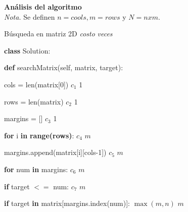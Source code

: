 \documentclass{article}
\begin{document}
\textbf{Análisis del algoritmo} \\
\textit{Nota.} Se definen $n=cools, m = rows$ y $N = nxm$.
\begin{algorithm}
\caption{Búsqueda en matriz 2D \hspace{3.5cm} \textit{costo} \hspace{0.5cm} \textit{veces}}\label{Primer algoritmo}
\begin{algorithmic}
\item \textbf{class} Solution:
    \item \hspace{0.3cm} \textbf{def} searchMatrix(self, matrix, target):
        \item \hspace{0.7cm} cols = len(matrix[0]) \hspace{5.2cm} $c_1$ \hspace{1.1cm} 1 
        \item \hspace{0.7cm} rows = len(matrix) \hspace{5.45cm} $c_2$ \hspace{1.1cm} 1
        \item \hspace{0.7cm} margins = [] \hspace{6.5cm} $c_3$ \hspace{1.1cm} 1
        \item \hspace{0.7cm} \textbf{for} i \textbf{in} \textbf{range(rows)}: \hspace{4.95cm} $c_4$ \hspace{1.1cm} $m$
            \item \hspace{1.2cm} margins.append(matrix[i][cols-1]) \hspace{2.85cm} $c_5$ \hspace{1.1cm} $m$
        \item \hspace{0.7cm} \textbf{for} num \textbf{in} margins: \hspace{5.3cm} $c_6$ \hspace{1.1cm} $m$
            \item \hspace{1.2cm} \textbf{if} target $<=$ num: \hspace{5.1cm} $c_7$ \hspace{1.1cm} $m$
                \item \hspace{1.6cm} \textbf{if} target \textbf{in} matrix[margins.index(num)]: \hspace{0.7cm} $\max(m,n)$ \hspace{0.4cm} $m$

\end{algorithmic}
\end{algorithm}
\end{document}
